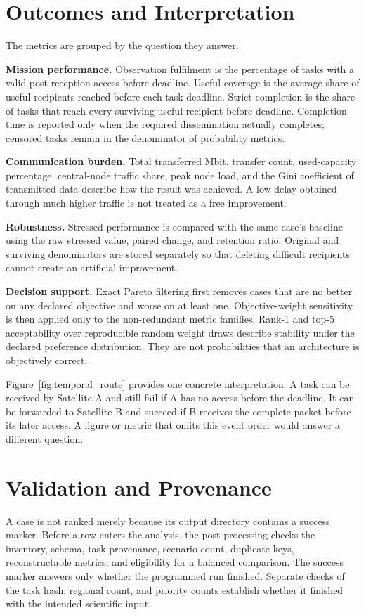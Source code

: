 \section{Outcomes and Interpretation}
The metrics are grouped by the question they answer.

\textbf{Mission performance.} Observation fulfilment is the percentage of tasks with a valid post-reception access before deadline. Useful coverage is the average share of useful recipients reached before each task deadline. Strict completion is the share of tasks that reach every surviving useful recipient before deadline. Completion time is reported only when the required dissemination actually completes; censored tasks remain in the denominator of probability metrics.

\textbf{Communication burden.} Total transferred Mbit, transfer count, used-capacity percentage, central-node traffic share, peak node load, and the Gini coefficient of transmitted data describe how the result was achieved. A low delay obtained through much higher traffic is not treated as a free improvement.

\textbf{Robustness.} Stressed performance is compared with the same case's baseline using the raw stressed value, paired change, and retention ratio. Original and surviving denominators are stored separately so that deleting difficult recipients cannot create an artificial improvement.

\textbf{Decision support.} Exact Pareto filtering first removes cases that are no better on any declared objective and worse on at least one. Objective-weight sensitivity is then applied only to the non-redundant metric families. Rank-1 and top-5 acceptability over reproducible random weight draws describe stability under the declared preference distribution. They are not probabilities that an architecture is objectively correct.

Figure~\ref{fig:temporal_route} provides one concrete interpretation. A task can be received by Satellite A and still fail if A has no access before the deadline. It can be forwarded to Satellite B and succeed if B receives the complete packet before its later access. A figure or metric that omits this event order would answer a different question.

\section{Validation and Provenance}
A case is not ranked merely because its output directory contains a success marker. Before a row enters the analysis, the post-processing checks the inventory, schema, task provenance, scenario count, duplicate keys, reconstructable metrics, and eligibility for a balanced comparison. The success marker answers only whether the programmed run finished. Separate checks of the task hash, regional count, and priority counts establish whether it finished with the intended scientific input.

